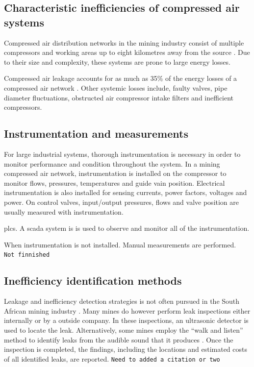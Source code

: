 	\subsection{Characteristic inefficiencies of compressed air systems}
		Compressed air distribution networks in the mining industry consist of multiple compressors and working areas up to eight kilometres away from the source \cite{Marais2012PhD}. Due to their size and complexity, these systems are prone to large energy losses.
		\par 
		Compressed air leakage accounts for as much as 35\% of the energy losses of a compressed air network \cite{Lawrence2004Improving}. Other systemic losses include, faulty valves, pipe diameter fluctuations, obstructed air compressor intake filters and inefficient compressors. 	
		\subsection{Instrumentation and measurements}
		For large industrial systems, thorough instrumentation is necessary in order to monitor performance and condition throughout the system. In a mining compressed air network, instrumentation is installed on the compressor to monitor flows, pressures, temperatures and guide vain position. Electrical instrumentation is also installed for sensing currents, power factors, voltages and power. On control valves, input/output pressures, flows and valve position are usually measured with instrumentation.	
		\par
		\Glspl{plc}. A \gls{scada} system is is used to observe and monitor all of the instrumentation. 
		\par
		When instrumentation is not installed. Manual measurements are performed.
		\\
		\texttt{Not finnished}
	\subsection{Inefficiency identification methods}
		Leakage and inefficiency detection strategies is not often pursued in the South African mining industry \cite{vanTonder2010Masters}. Many mines do however perform leak inspections either internally or by a outside company. In these inspections, an ultrasonic detector is used to locate the leak. Alternatively, some mines employ the \enquote{walk and listen} method to identify leaks from the audible sound that it produces \cite{vanTonder2010Masters}. Once the inspection is completed, the findings, including the locations and estimated costs of all identified leaks, are reported.
		\texttt{Need to added a citation or two}
